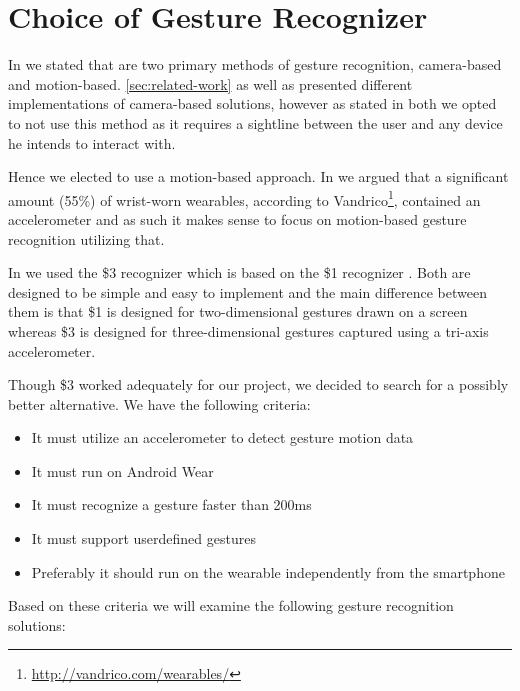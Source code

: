 \section{Choice of Gesture Recognizer}
\label{sec:analysis:choice-of-gesture-recognizer}

In \cite{prespecialisation} we stated that are two primary methods of gesture recognition, camera-based and motion-based.
\cref{sec:related-work} as well as \cite{prespecialisation} presented different implementations of camera-based solutions, however as stated in both we opted to not use this method as it requires a sightline between the user and any device he intends to interact with.

Hence we elected to use a motion-based approach.
In \cite{prespecialisation} we argued that a significant amount (55\%) of wrist-worn wearables, according to Vandrico\footnote{\url{http://vandrico.com/wearables/}}, contained an accelerometer and as such it makes sense to focus on motion-based gesture recognition utilizing that.

In \cite{prespecialisation} we used the \$3 recognizer \cite{threedollar} which is based on the \$1 recognizer \cite{wobbrock2007gestures}.
Both are designed to be simple and easy to implement and the main difference between them is that \$1 is designed for two-dimensional gestures drawn on a screen whereas \$3 is designed for three-dimensional gestures captured using a tri-axis accelerometer.

Though \$3 worked adequately for our project, we decided to search for a possibly better alternative.
We have the following criteria:

\begin{itemize}
    \item It must utilize an accelerometer to detect gesture motion data
    \item It must run on Android Wear
    \item It must recognize a gesture faster than 200ms
    \item It must support userdefined gestures
    \item Preferably it should run on the wearable independently from the smartphone
\end{itemize}
Based on these criteria we will examine the following gesture recognition solutions:

